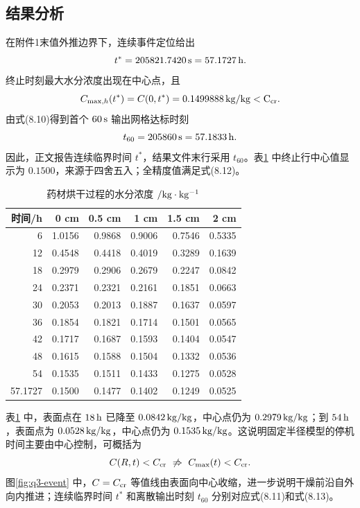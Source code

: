 \documentclass[UTF8,a4paper,12pt]{ctexart}
\numberwithin{equation}{section}
\begin{document}
\subsection{结果分析}
在附件1末值外推边界下，连续事件定位给出
\begin{equation}
  t^*=205821.7420\rm\,s=57.1727\rm\,h.
\end{equation}
终止时刻最大水分浓度出现在中心点，且
\begin{equation}
  C_{\max,h}(t^*)=C(0,t^*)=0.1499888\rm\,kg/kg<C_{\rm cr}.
\end{equation}
由式(8.10)得到首个 $60\rm\,s$ 输出网格达标时刻
\begin{equation}
  t_{60}=205860\rm\,s=57.1833\rm\,h.
\end{equation}
因此，正文报告连续临界时间 $t^*$，结果文件末行采用 $t_{60}$。表\ref{tab:q3-moist} 中终止行中心值显示为 $0.1500$，来源于四舍五入；全精度值满足式(8.12)。

\begin{table}[H]
  \centering
  \caption{药材烘干过程的水分浓度 $/\rm kg\cdot kg^{-1}$}
  \label{tab:q3-moist}
  \begin{tabular}{rrrrrr}
    \toprule
    时间/h & 0 cm & 0.5 cm & 1 cm & 1.5 cm & 2 cm\\ \midrule
    6 & 1.0156 & 0.9868 & 0.9006 & 0.7546 & 0.5335\\
    12 & 0.4548 & 0.4418 & 0.4019 & 0.3289 & 0.1639\\
    18 & 0.2979 & 0.2906 & 0.2679 & 0.2247 & 0.0842\\
    24 & 0.2371 & 0.2321 & 0.2161 & 0.1851 & 0.0663\\
    30 & 0.2053 & 0.2013 & 0.1887 & 0.1637 & 0.0597\\
    36 & 0.1854 & 0.1821 & 0.1714 & 0.1501 & 0.0565\\
    42 & 0.1717 & 0.1687 & 0.1593 & 0.1404 & 0.0547\\
    48 & 0.1615 & 0.1588 & 0.1504 & 0.1332 & 0.0536\\
    54 & 0.1535 & 0.1511 & 0.1433 & 0.1275 & 0.0528\\
    57.1727 & 0.1500 & 0.1477 & 0.1402 & 0.1249 & 0.0525\\
    \bottomrule
  \end{tabular}
\end{table}

表\ref{tab:q3-moist} 中，表面点在 $18\rm\,h$ 已降至 $0.0842\rm\,kg/kg$，中心点仍为 $0.2979\rm\,kg/kg$；到 $54\rm\,h$，表面点为 $0.0528\rm\,kg/kg$，中心点仍为 $0.1535\rm\,kg/kg$。这说明固定半径模型的停机时间主要由中心控制，可概括为
\begin{equation}
  C(R,t)<C_{\rm cr}\ \not\Rightarrow\ C_{\max}(t)<C_{\rm cr}.
\end{equation}
图\ref{fig:q3-event} 中，$C=C_{\rm cr}$ 等值线由表面向中心收缩，进一步说明干燥前沿自外向内推进；连续临界时间 $t^*$ 和离散输出时刻 $t_{60}$ 分别对应式(8.11)和式(8.13)。
\end{document}
